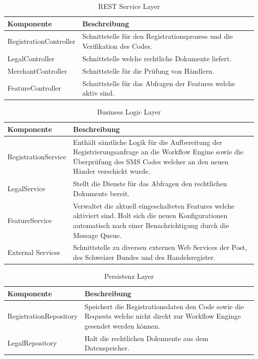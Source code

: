 \begin{table}[H]
	\centering
	\caption{REST Service Layer}
	\begin{tabular}{ | p{4cm} | p{12cm} | }
		\toprule
		{\textbf{Komponente}} & {\textbf{Beschreibung}} \\
		\midrule
		RegistrationController &  Schnittstelle für den Registrationsprozess und die Verifikation des Codes. \\ \hline
		LegalController &  Schnittstelle welche rechtliche Dokumente liefert. \\ \hline
		MerchantController &  Schnittstelle für die Prüfung von Händlern.\\ \hline
		FeatureController & Schnittstelle für das Abfragen der Features welche aktiv sind. \\
		\bottomrule
	\end{tabular}
\end{table}

\begin{table}[H]
	\centering
	\caption{Business Logic Layer}
	\begin{tabular}{ | p{4cm} | p{12cm} | }
		\toprule
		{\textbf{Komponente}} & {\textbf{Beschreibung}} \\
		\midrule
		RegistrationService &  Enthält sämtliche Logik für die Aufbereitung der Registrierungsanfrage an die Workflow Engine sowie die Überprüfung des SMS Codes welcher an den neuen Händer verschickt wurde.\\ \hline
		LegalService &  Stellt die Dienste für das Abfragen den rechtlichen Dokumente bereit. \\ \hline
		FeatureService &  Verwaltet die aktuell eingeschalteten Features welche aktiviert sind. Holt sich die neuen Konfigurationen automatisch nach einer Benachrichtigung durch die Message Queue. \\ \hline
		External Services & Schnittstelle zu diversen externen Web Services der Post, des Schweizer Bundes und des Handelsregister. \\
		\bottomrule
	\end{tabular}
\end{table}

\begin{table}[H]
	\centering
	\caption{Persistenz Layer}
	\begin{tabular}{ | p{4cm} | p{12cm} | }
		\toprule
		{\textbf{Komponente}} & {\textbf{Beschreibung}} \\
		\midrule
		RegistrationRepository &  Speichert die Registrationsdaten den Code sowie die Requests welche nicht direkt zur Workflow Enginge gesendet werden können. \\ \hline
		LegalRepository &  Holt die rechtlichen Dokumente aus dem Datenspeicher. \\
		\bottomrule
	\end{tabular}
\end{table}

